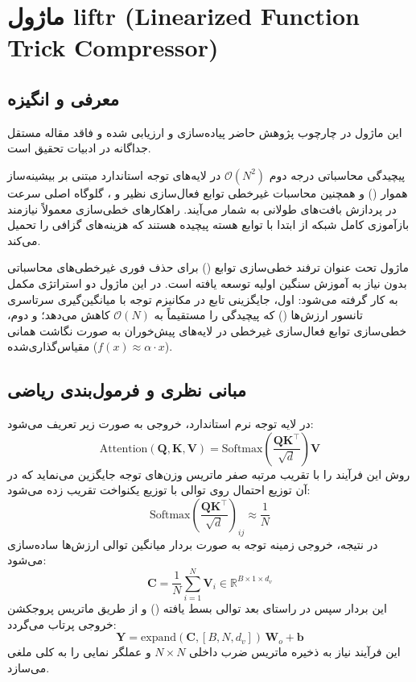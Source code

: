 \section{ماژول liftr (Linearized Function Trick Compressor)}
\label{sec:module_liftr}

\subsection{معرفی و انگیزه}
این ماژول در چارچوب پژوهش حاضر پیاده‌سازی و ارزیابی شده و فاقد مقاله مستقل جداگانه در ادبیات تحقیق است.

پیچیدگی محاسباتی درجه دوم $\mathcal{O}(N^2)$ در لایه‌های توجه استاندارد مبتنی بر بیشینه‌ساز هموار () و همچنین محاسبات غیرخطی توابع فعال‌سازی نظیر  و ، گلوگاه اصلی سرعت در پردازش بافت‌های طولانی به شمار می‌آیند. راهکارهای خطی‌سازی معمولاً نیازمند بازآموزی کامل شبکه از ابتدا با توابع هسته پیچیده هستند که هزینه‌های گزافی را تحمیل می‌کند.

ماژول  تحت عنوان ترفند خطی‌سازی توابع () برای حذف فوری غیرخطی‌های محاسباتی بدون نیاز به آموزش سنگین اولیه توسعه یافته است. در این ماژول دو استراتژی مکمل به کار گرفته می‌شود: اول، جایگزینی تابع  در مکانیزم توجه با میانگین‌گیری سرتاسری تانسور ارزش‌ها () که پیچیدگی را مستقیماً به $\mathcal{O}(N)$ کاهش می‌دهد؛ و دوم، خطی‌سازی توابع فعال‌سازی غیرخطی در لایه‌های پیش‌خوران به صورت نگاشت همانی مقیاس‌گذاری‌شده ($f(x) \approx \alpha \cdot x$).

\subsection{مبانی نظری و فرمول‌بندی ریاضی}
در لایه توجه نرم استاندارد، خروجی به صورت زیر تعریف می‌شود:
\begin{equation}
\text{Attention}(\mathbf{Q}, \mathbf{K}, \mathbf{V}) = \text{Softmax}\left( \frac{\mathbf{Q}\mathbf{K}^\top}{\sqrt{d}} \right) \mathbf{V}
\end{equation}
روش  این فرآیند را با تقریب مرتبه صفر ماتریس وزن‌های توجه جایگزین می‌نماید که در آن توزیع احتمال روی توالی با توزیع یکنواخت تقریب زده می‌شود:
\begin{equation}
\text{Softmax}\left( \frac{\mathbf{Q}\mathbf{K}^\top}{\sqrt{d}} \right)_{ij} \approx \frac{1}{N}
\end{equation}
در نتیجه، خروجی زمینه توجه به صورت بردار میانگین توالی ارزش‌ها ساده‌سازی می‌شود:
\begin{equation}
\mathbf{C} = \frac{1}{N} \sum_{i=1}^N \mathbf{V}_i \in \mathbb{R}^{B \times 1 \times d_v}
\end{equation}
این بردار سپس در راستای بعد توالی بسط یافته () و از طریق ماتریس پروجکشن خروجی پرتاب می‌گردد:
\begin{equation}
\mathbf{Y} = \text{expand}(\mathbf{C}, [B, N, d_v]) \, \mathbf{W}_o + \mathbf{b}
\end{equation}
این فرآیند نیاز به ذخیره ماتریس ضرب داخلی $N \times N$ و عملگر نمایی  را به کلی ملغی می‌سازد.

